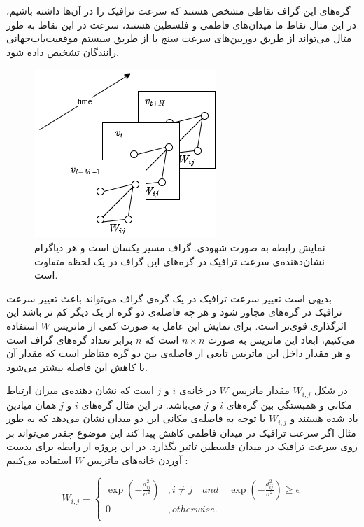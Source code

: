 گره‌های این گراف نقاطی مشخص هستند که سرعت ترافیک را در آن‌ها داشته باشیم، در این مثال نقاط ما میدان‌های فاطمی و فلسطین هستند،
سرعت در این نقاط به طور مثال می‌تواند از طریق دوربین‌های سرعت سنج یا از طریق سیستم موقعیت‌‌یاب‌جهانی رانندگان تشخیص داده شود.

\begin{figure}
  \includegraphics{./images/base.png}
  \centering
  \caption{
نمایش رابطه  به صورت شهودی.
گراف مسیر یکسان است و هر دیاگرام نشان‌دهنده‌ی سرعت ترافیک در گره‌های این گراف در یک لحظه متفاوت است.
}
  \label{fig:base}
\end{figure}

بدیهی است تغییر سرعت ترافیک در یک گره‌ی گراف می‌تواند باعث تغییر سرعت ترافیک در گره‌های مجاور شود و هر چه فاصله‌ی دو گره از یک دیگر کم تر باشد این اثرگذاری قوی‌تر است.
برای نمایش این عامل به صورت کمی از ماتریس $W$ استفاده می‌کنیم، ابعاد این ماتریس به صورت $n \times n$ است که $n$ برابر تعداد گره‌های گراف است و هر مقدار داخل این ماتریس تابعی از فاصله‌ی بین دو گره متناظر است که مقدار آن با کاهش این فاصله بیشتر می‌شود.

در شکل  $W_{i,j}$ مقدار ماتریس $W$ در خانه‌ی $i$ و $j$ است که نشان دهنده‌ی میزان ارتباط مکانی و همبستگی بین گره‌های $i$ و $j$ می‌باشد.
در این مثال گره‌های $i$ و $j$ همان میادین یاد شده هستند و $W_{i,j}$ با توجه به فاصله‌ی مکانی این دو میدان نشان می‌دهد که
به طور مثال اگر سرعت ترافیک در میدان فاطمی کاهش پیدا کند این موضوع چقدر می‌تواند بر روی سرعت ترافیک در میدان فلسطین تاثیر بگذارد.
در این پروژه از رابطه‌  برای بدست آوردن خانه‌های ماتریس $W$ استفاده می‌کنیم :

\begin{equation}
  W_{i,j} = \left\{
    \begin{array}{ll}
      \exp(-\frac{d^{2}_{ij}}{\sigma^{2}}) & , i \neq j \quad and \quad \exp(-\frac{d^{2}_{ij}}{\sigma^{2}}) \geq \epsilon \\
      0 & , otherwise. \\
    \end{array}\right.
  \label{eq:distance}
\end{equation}

